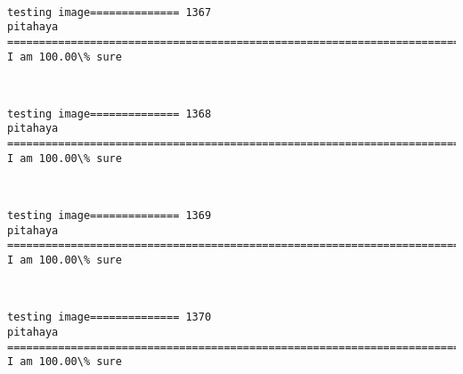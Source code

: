 \documentclass[11pt]{article}
\begin{document}
    \begin{center}
    \end{center}
    { \hspace*{\fill} \\}
    
    \begin{Verbatim}[commandchars=\\\{\}]
testing image============== 1367
pitahaya
============================================================================
I am 100.00\% sure

    \end{Verbatim}

    \begin{center}
    \end{center}
    { \hspace*{\fill} \\}
    
    \begin{Verbatim}[commandchars=\\\{\}]
testing image============== 1368
pitahaya
============================================================================
I am 100.00\% sure

    \end{Verbatim}

    \begin{center}
    \end{center}
    { \hspace*{\fill} \\}
    
    \begin{Verbatim}[commandchars=\\\{\}]
testing image============== 1369
pitahaya
============================================================================
I am 100.00\% sure

    \end{Verbatim}

    \begin{center}
    \end{center}
    { \hspace*{\fill} \\}
    
    \begin{Verbatim}[commandchars=\\\{\}]
testing image============== 1370
pitahaya
============================================================================
I am 100.00\% sure

    \end{Verbatim}
\end{document}
